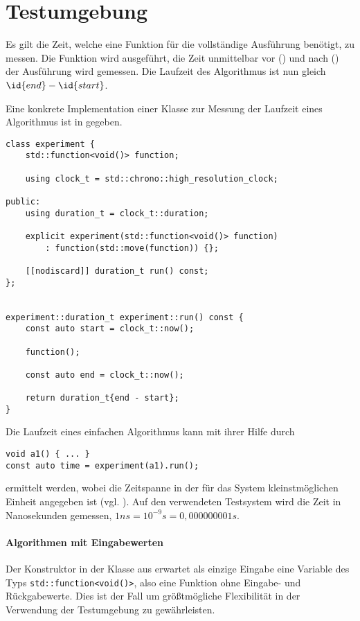 \section{Testumgebung}
\label{sec:runtime-environment}

Es gilt die Zeit, welche eine Funktion für die vollständige Ausführung benötigt, zu messen. Die Funktion wird ausgeführt, die Zeit unmittelbar vor () und nach () der Ausführung wird gemessen. Die Laufzeit des Algorithmus ist nun gleich $\id{end} - \id{start}$.

Eine konkrete Implementation einer Klasse zur Messung der Laufzeit eines Algorithmus ist in  gegeben.

\begin{lstlisting}[caption={Implementation einer Klasse zur Ermittlung der Laufzeit eines Algorithmus.}, label=lst:experiment]
class experiment {
	std::function<void()> function;

	using clock_t = std::chrono::high_resolution_clock;

public:
	using duration_t = clock_t::duration;

	explicit experiment(std::function<void()> function)
		: function(std::move(function)) {};

	[[nodiscard]] duration_t run() const;
};


experiment::duration_t experiment::run() const {
	const auto start = clock_t::now();

	function();

	const auto end = clock_t::now();

	return duration_t{end - start};
}
\end{lstlisting}
\noindent
Die Laufzeit eines einfachen Algorithmus kann mit ihrer Hilfe durch
\begin{lstlisting}[numbers=none]
void a1() { ... }
const auto time = experiment(a1).run();
\end{lstlisting}
ermittelt werden, wobei die Zeitspanne in der für das System kleinstmöglichen Einheit angegeben ist (vgl. \cite[652]{ISO-C++17}). Auf den verwendeten Testsystem wird die Zeit in Nanosekunden gemessen, $1ns = 10^{-9}s = 0,000000001s$.

\paragraph{Algorithmen mit Eingabewerten} Der Konstruktor in der Klasse aus  erwartet als einzige Eingabe eine Variable des Typs \lstinline{std::function<void()>}, also eine Funktion ohne Eingabe- und Rückgabewerte. Dies ist der Fall um größtmögliche Flexibilität in der Verwendung der Testumgebung zu gewährleisten.

